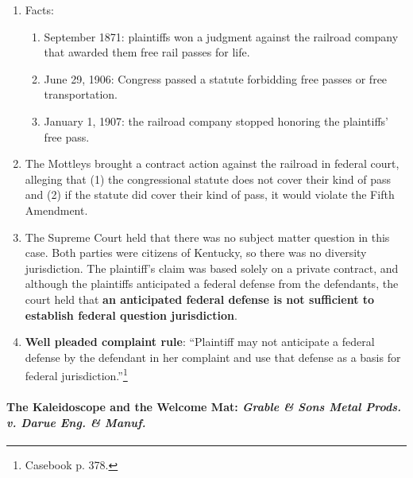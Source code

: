 \begin{enumerate}
    \item Facts:
    \begin{enumerate}
        \item September 1871: plaintiffs won a judgment against the railroad company that awarded them free rail passes for life.
        \item June 29, 1906: Congress passed a statute forbidding free passes or free transportation.
        \item January 1, 1907: the railroad company stopped honoring the plaintiffs' free pass.
    \end{enumerate}
    \item The Mottleys brought a contract action against the railroad in federal court, alleging that (1) the congressional statute does not cover their kind of pass and (2) if the statute did cover their kind of pass, it would violate the Fifth Amendment.
    \item The Supreme Court held that there was no subject matter question in this case. Both parties were citizens of Kentucky, so there was no diversity jurisdiction. The plaintiff's claim was based solely on a private contract, and although the plaintiffs anticipated a federal defense from the defendants, the court held that \textbf{an anticipated federal defense is not sufficient to establish federal question jurisdiction}.
    \item \textbf{Well pleaded complaint rule}: ``Plaintiff may not anticipate a federal defense by the defendant in her complaint and use that defense as a basis for federal jurisdiction.''\footnote{Casebook p. 378.}
\end{enumerate}

\paragraph{The Kaleidoscope and the Welcome Mat: \emph{Grable \& Sons Metal Prods. v. Darue Eng. \& Manuf.}}

